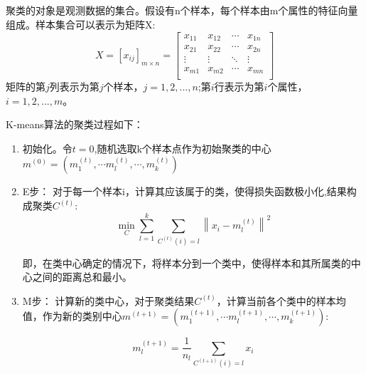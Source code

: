 \documentclass[lang=cn,a4paper,cite=authoryear]{elegantpaper}
\begin{document}
\subsection*{}
聚类的对象是观测数据的集合。假设有n个样本，每个样本由m个属性的特征向量组成。样本集合可以表示为矩阵X:
$$
X=\left[ x_{ij} \right] _{m\times n}=\left[ \begin{matrix}
	x_{11}&		x_{12}&		\cdots&		x_{1n}\\
	x_{21}&		x_{22}&		\cdots&		x_{2n}\\
	\vdots&		\vdots&		\ddots&		\vdots\\
	x_{m1}&		x_{m2}&		\cdots&		x_{mn}\\
\end{matrix} \right] 
$$
矩阵的第$j$列表示为第$j$个样本，$j=1,2,...,n$;第$i$行表示为第$i$个属性，$i=1,2,...,m$。
\par K-means算法的聚类过程如下：
\begin{enumerate}[(1)]
	\item 初始化。令$t=0$,随机选取k个样本点作为初始聚类的中心$m^{\left( 0 \right)}=\left( m_{1}^{\left( t \right)},\cdots m_{l}^{\left( t \right)},\cdots ,m_{k}^{\left( t \right)} \right) $
	\item E步：
	对于每一个样本i，计算其应该属于的类，使得损失函数极小化,结果构成聚类$C^{\left( t \right)}$:
	$$
	\min_C \sum_{l=1}^k{\sum_{C_{}^{\left( t \right)}\left( i \right) =l}^{}{\left\| x_i-m_{l}^{\left( t \right)} \right\| ^2}}
	$$
	\par 即，在类中心确定的情况下，将样本分到一个类中，使得样本和其所属类的中心之间的距离总和最小。
	\item M步：
     计算新的类中心，对于聚类结果$C^{\left( t \right)}$，计算当前各个类中的样本均值，作为新的类别中心$m^{\left( t+1 \right)}=\left( m_{1}^{\left( t+1 \right)},\cdots m_{l}^{\left( t+1 \right)},\cdots ,m_{k}^{\left( t+1 \right)} \right) $:
	\par
	$$
	m_{l}^{\left( t+1 \right)}=\frac{1}{n_l}\sum_{C^{\left( t+1 \right)}\left( i \right) =l}{x_i}
	$$
\end{enumerate}
\end{document}
